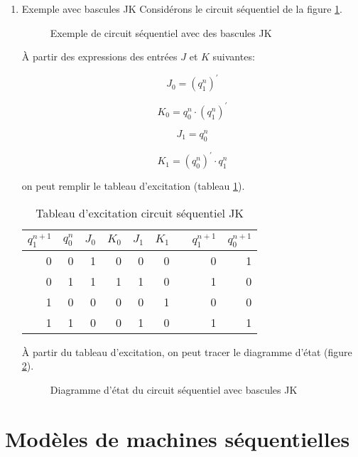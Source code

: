 \documentclass[letter, oneside]{book}
\begin{document}
\begin{enumerate}
\item Exemple avec bascules JK
\label{sec:orgbf77012}
Considérons le circuit séquentiel de la figure \ref{fig:orga9924b7}.

\begin{figure}[htbp]
\centering

\caption{\label{fig:orga9924b7}Exemple de circuit séquentiel avec des bascules JK}
\end{figure}

À partir des expressions des entrées \(J\) et \(K\) suivantes:

$$J_0 = (q_1^{n})^\prime$$

$$K_0 = q_0^{n} \cdot (q_1^{n})^\prime$$

$$J_1 = q_0^{n}$$

$$K_1 = (q_0^{n})^\prime \cdot q_1^{n}$$

on peut remplir le tableau d'excitation (tableau \ref{tab:org1c51c77}).

\begin{table}[htbp]
\caption{\label{tab:org1c51c77}Tableau d'excitation circuit séquentiel JK}
\centering
\begin{tabular}{rrrrrrlrr}
\(q_1^{n+1}\) & \(q_0^n\) & \(J_0\) & \(K_0\) & \(J_1\) & \(K_1\) &  & \(q_1^{n+1}\) & \(q_0^{n+1}\)\\[0pt]
\hline
0 & 0 & 1 & 0 & 0 & 0 &  & 0 & 1\\[0pt]
0 & 1 & 1 & 1 & 1 & 0 &  & 1 & 0\\[0pt]
1 & 0 & 0 & 0 & 0 & 1 &  & 0 & 0\\[0pt]
1 & 1 & 0 & 0 & 1 & 0 &  & 1 & 1\\[0pt]
\end{tabular}
\end{table}

À partir du tableau d'excitation, on peut tracer le diagramme d'état
(figure \ref{fig:org09e187a}).

\begin{figure}[htbp]
\centering

\caption{\label{fig:org09e187a}Diagramme d'état du circuit séquentiel avec bascules JK}
\end{figure}
\end{enumerate}

\section{Modèles de machines séquentielles}
\label{sec:org7b61bc6}
\end{document}
